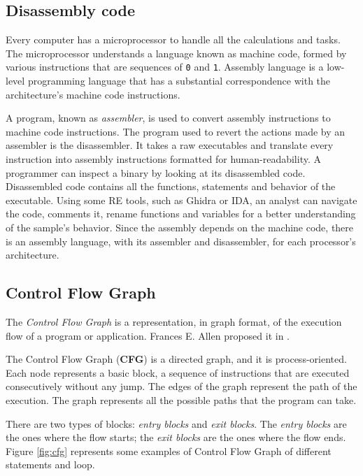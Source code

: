 \subsection{Disassembly code}

Every computer has a microprocessor to handle all the calculations and tasks. The microprocessor understands a language known as machine code, formed by various instructions that are sequences of \texttt{0} and \texttt{1}. Assembly language is a low-level programming language that has a substantial correspondence with the architecture's machine code instructions.

A program, known as \textit{assembler}, is used to convert assembly instructions to machine code instructions. The program used to revert the actions made by an assembler is the disassembler. It takes a raw executables and translate every instruction into assembly instructions formatted for human-readability. A programmer can inspect a binary by looking at its disassembled code. Disassembled code contains all the functions, statements and behavior of the executable. Using some RE tools, such as Ghidra or IDA, an analyst can navigate the code, comments it, rename functions and variables for a better understanding of the sample's behavior. 
Since the assembly depends on the machine code, there is an assembly language, with its assembler and disassembler, for each processor's architecture.

\subsection{Control Flow Graph}

The \textit{Control Flow Graph} is a representation, in graph format, of the execution flow of a program or application. Frances E. Allen proposed it in \cite{allen1970control}.

The Control Flow Graph (\textbf{CFG}) is a directed graph, and it is process-oriented. Each node represents a basic block, a sequence of instructions that are executed consecutively without any jump. The edges of the graph represent the path of the execution. The graph represents all the possible paths that the program can take.

There are two types of blocks:\textit{ entry blocks} and \textit{exit blocks}.
The \textit{entry blocks} are the ones where the flow starts; the \textit{exit blocks} are the ones where the flow ends. Figure \ref{fig:cfg} represents some examples of Control Flow Graph of different statements and loop. 

